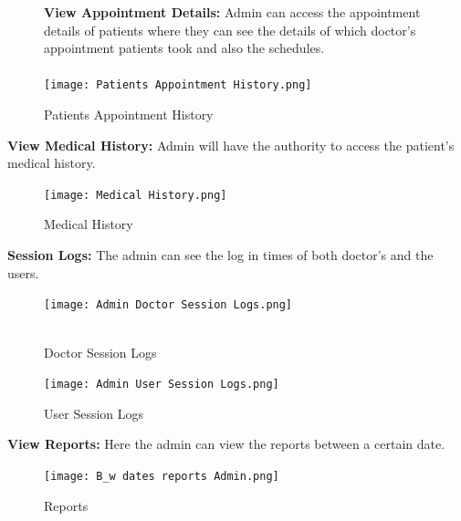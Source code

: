 \documentclass[14pt,a4paper,calibribody]{article}
\begin{document}
\begin{figure}[h]
\textbf{View Appointment Details:} Admin can access the appointment details of patients where they can see the details of which doctor’s appointment patients took and also the schedules.\\\\
\texttt{[image: Patients Appointment History.png]}\\
\caption{Patients Appointment History}
\end{figure}
\textbf{View Medical History:} Admin will have the authority to access the patient’s medical history.\\
\begin{figure}[h]
\texttt{[image: Medical History.png]}\\
\caption{Medical History}
\end{figure}
\clearpage
\textbf{Session Logs:} The admin can see the log in times of both doctor's and the users.\\
\begin{figure}[h]
\texttt{[image: Admin Doctor Session Logs.png]}\\\\
\caption{Doctor Session Logs}
\end{figure}
\begin{figure}[h]
\texttt{[image: Admin User Session Logs.png]}\\
\caption{User Session Logs}
\end{figure}
\clearpage
\textbf{View Reports:} Here the admin can view the reports between a certain date.\\
\begin{figure}[h]
\texttt{[image: B\_w dates reports Admin.png]}\\
\caption{Reports}
\end{figure}
\end{document}
